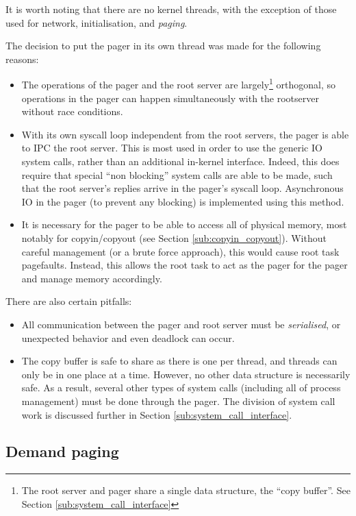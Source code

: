\documentclass[12pt,english]{article}
\begin{document}
It is worth noting that there are no kernel threads, with the exception of those used for network, initialisation, and \emph{paging}.

The decision to put the pager in its own thread was made for the following reasons:
\begin{itemize}
\item The operations of the pager and the root server are largely\footnote{The root server and pager share a single data structure, the ``copy buffer''.  See Section \ref{sub:system_call_interface}} orthogonal, so operations in the pager can happen simultaneously with the rootserver without race conditions.
\item With its own syscall loop independent from the root servers, the pager is able to IPC the root server.  This is most used in order to use the generic IO system calls, rather than an additional in-kernel interface.  Indeed, this does require that special ``non blocking'' system calls are able to be made, such that the root server's replies arrive in the pager's syscall loop.  Asynchronous IO in the pager (to prevent any blocking) is implemented using this method.
\item It is necessary for the pager to be able to access all of physical memory, most notably for copyin/copyout (see Section \ref{sub:copyin_copyout}).  Without careful management (or a brute force approach), this would cause root task pagefaults.  Instead, this allows the root task to act as the pager for the pager and manage memory accordingly.
\end{itemize}

There are also certain pitfalls:
\begin{itemize}
\item All communication between the pager and root server must be \emph{serialised}, or unexpected behavior and even deadlock can occur.
\item The copy buffer is safe to share as there is one per thread, and threads can only be in one place at a time.  However, no other data structure is necessarily safe.  As a result, several other types of system calls (including all of process management) must be done through the pager.  The division of system call work is discussed further in Section \ref{sub:system_call_interface}.
\end{itemize}

\subsection{Demand paging} \label{sub:demand_paging}
\end{document}
